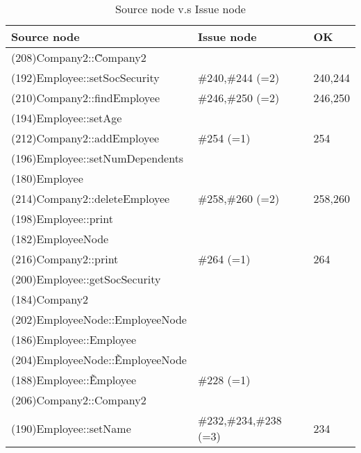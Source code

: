\begin{table}[hb]
\begin{center}
\begin{tabular}{|l|l|l|}
\hline
Source node & Issue node  & OK\\
\hline
(208)Company2::\~Company2 &  & \\
(192)Employee::setSocSecurity & \#240,\#244 (=2) & 240,244\\
(210)Company2::findEmployee & \#246,\#250 (=2) & 246,250\\
(194)Employee::setAge &  & \\
(212)Company2::addEmployee & \#254 (=1) & 254\\
(196)Employee::setNumDependents &  & \\
(180)Employee &  & \\
(214)Company2::deleteEmployee & \#258,\#260 (=2) & 258,260\\
(198)Employee::print &  & \\
(182)EmployeeNode &  & \\
(216)Company2::print & \#264 (=1) & 264\\
(200)Employee::getSocSecurity &  & \\
(184)Company2 &  & \\
(202)EmployeeNode::EmployeeNode &  & \\
(186)Employee::Employee &  & \\
(204)EmployeeNode::\~EmployeeNode &  & \\
(188)Employee::\~Employee & \#228 (=1) & \\
(206)Company2::Company2 &  & \\
(190)Employee::setName & \#232,\#234,\#238 (=3) & 234\\
\hline
\end{tabular}
\caption{Source node v.s Issue node}
\end{center}
\end{table}

%
